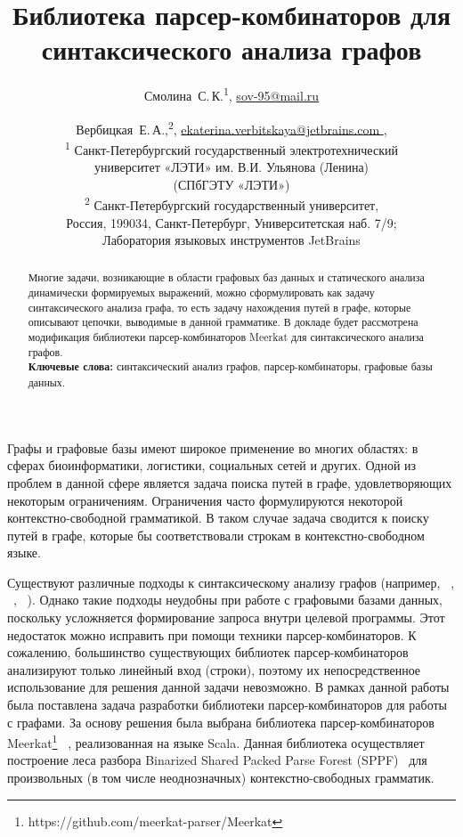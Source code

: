 \documentclass [a4paper] {article}
\title %
  {Библиотека парсер-комбинаторов для синтаксического анализа графов}
\author{
  Смолина~С.\,К.\textsuperscript{1}, \url {sov-95@mail.ru} \and %
  Вербицкая~Е.\,А.,\textsuperscript{2}, \url {ekaterina.verbitskaya@jetbrains.com }, \\
  \textsuperscript{1} Санкт-Петербургский государственный электротехнический
  \\университет «ЛЭТИ» им. В.И. Ульянова (Ленина)
  \\(СПбГЭТУ «ЛЭТИ») \\
  \textsuperscript{2} Санкт-Петербургский государственный университет, \\
  Россия, 199034, Санкт-Петербург, Университетская наб. 7/9; \\
  Лаборатория языковых инструментов JetBrains 
}
\date {}    %
\begin{document}

\maketitle

\begin {abstract}
  Многие задачи, возникающие в области графовых баз данных и статического анализа динамически формируемых выражений, можно сформулировать как задачу синтаксического анализа графа, то есть задачу нахождения путей в графе, которые описывают цепочки, выводимые в данной грамматике. В докладе будет рассмотрена модификация библиотеки парсер-комбинаторов Meerkat для синтаксического анализа графов. 
  \\ \textbf {Ключевые слова:} синтаксический анализ графов, парсер-комбинаторы, графовые базы данных.
\end {abstract}

Графы и графовые базы имеют широкое применение во многих областях: в сферах биоинформатики, логистики, социальных сетей и других. Одной из проблем в данной сфере является задача поиска путей в графе, удовлетворяющих некоторым ограничениям. Ограничения часто формулируются некоторой контекстно-свободной грамматикой. В таком случае задача сводится к поиску путей в графе, которые бы соответствовали строкам в контекстно-свободном языке.


Существуют различные подходы к синтаксическому анализу графов (например, ~\cite{smolina-spbgetu-hellings}, ~\cite{smolina-spbgetu-graph-parsing}, ~\cite{smolina-spbgetu-sevon}). Однако такие подходы неудобны при работе с графовыми базами данных, поскольку усложняется формирование запроса внутри целевой программы. Этот недостаток можно исправить при помощи техники парсер-комбинаторов. К сожалению, большинство существующих библиотек парсер-комбинаторов анализируют только линейный вход (строки), поэтому их непосредственное использование для решения данной задачи невозможно. В рамках данной работы была поставлена задача разработки библиотеки парсер-комбинаторов для работы с графами.
За основу решения была выбрана библиотека парсер-комбинаторов Meerkat\footnote{https://github.com/meerkat-parser/Meerkat} ~\cite{smolina-spbgetu-meerkat}, реализованная на языке Scala. Данная библиотека осуществляет построение леса разбора Binarized Shared Packed Parse Forest (SPPF)~\cite{smolina-spbgetu-sppf} для произвольных (в том числе неоднозначных) контекстно-свободных грамматик.
\end{document}
